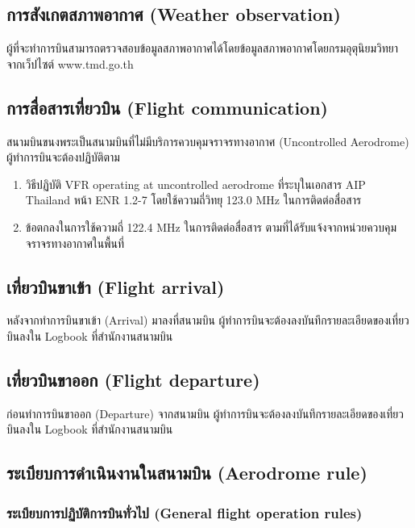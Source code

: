 \subsection{การสังเกตสภาพอากาศ (Weather observation)}

ผู้ที่จะทำการบินสามารถตรวจสอบข้อมูลสภาพอากาศได้โดยข้อมูลสภาพอากาศโดยกรมอุตุนิยมวิทยา จากเว็ปไซต์ www.tmd.go.th

\subsection{การสื่อสารเที่ยวบิน (Flight communication)}

สนามบินขนงพระเป็นสนามบินที่ไม่มีบริการควบคุมจราจรทางอากาศ (Uncontrolled Aerodrome) ผู้ทำการบินจะต้องปฏิบัติตาม

\begin{enumerate}
\item วิธีปฏิบัติ VFR operating at uncontrolled aerodrome ที่ระบุในเอกสาร AIP Thailand หน้า ENR 1.2-7 โดยใช้ความถี่วิทยุ 123.0 MHz ในการติดต่อสื่อสาร 
\item ข้อตกลงในการใช้ความถี่ 122.4 MHz ในการติดต่อสื่อสาร ตามที่ได้รับแจ้งจากหน่วยควบคุมจราจรทางอากาศในพื้นที่
\end{enumerate}

\subsection{เที่ยวบินขาเข้า (Flight arrival) }

หลังจากทำการบินขาเข้า (Arrival) มาลงที่สนามบิน ผู้ทำการบินจะต้องลงบันทึกรายละเอียดของเที่ยวบินลงใน Logbook ที่สำนักงานสนามบิน

\subsection{เที่ยวบินขาออก (Flight departure)}

ก่อนทำการบินขาออก (Departure) จากสนามบิน ผู้ทำการบินจะต้องลงบันทึกรายละเอียดของเที่ยวบินลงใน Logbook ที่สำนักงานสนามบิน

\subsection{ระเบียบการดำเนินงานในสนามบิน (Aerodrome rule)}

\subsubsection{ระเบียบการปฏิบัติการบินทั่วไป (General flight operation rules)}

